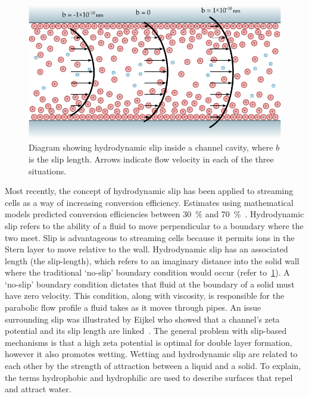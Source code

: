     \begin{figure}
      \centering
      \includegraphics[height=6cm]{content/pt1/graphics/HydrodynamicSlip}
      \caption[Diagram showing hydrodynamic slip inside a channel cavity.]{\label{fig:HydrodynamicSlip}Diagram showing hydrodynamic slip inside a channel cavity, where $b$ is the slip length. Arrows indicate flow velocity in each of the three situations.}
    \end{figure}
    Most recently, the concept of hydrodynamic slip has been applied to streaming cells as a way of increasing conversion efficiency.
    Estimates using mathematical models predicted conversion efficiencies between \SI{30}{\percent} and \SI{70}{\percent}~\cite{Pennathur2007, Davidson2008a, Ren2008}.
    Hydrodynamic slip refers to the ability of a fluid to move perpendicular to a boundary where the two meet.
    Slip is advantageous to streaming cells because it permits ions in the Stern layer to move relative to the wall.
    Hydrodynamic slip has an associated length (the slip-length), which refers to an imaginary distance into the solid wall where the traditional `no-slip' boundary condition would occur (refer to~\cref{fig:HydrodynamicSlip}).
    A `no-slip' boundary condition dictates that fluid at the boundary of a solid must have zero velocity.
    This condition, along with viscosity, is responsible for the parabolic flow profile a fluid takes as it moves through pipes.
    An issue surrounding slip was illustrated by Eijkel who showed that a channel's zeta potential and its slip length are linked~\cite{Eijkel2007}.
    The general problem with slip-based mechanisms is that a high zeta potential is optimal for double layer formation, however it also promotes wetting.
    Wetting and hydrodynamic slip are related to each other by the strength of attraction between a liquid and a solid.
    To explain, the terms hydrophobic and hydrophilic are used to describe surfaces that repel and attract water.
